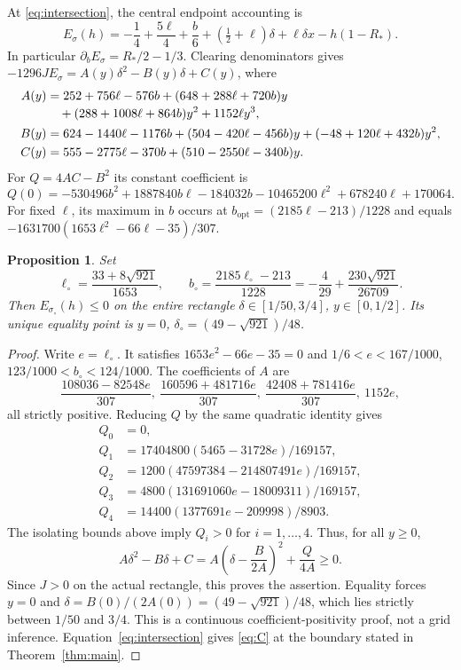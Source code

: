 \documentclass[11pt,a4paper]{article}
\newtheorem{proposition}[theorem]{Proposition}
\theoremstyle{definition}
\newcommand{\sig}{\sigma_\circ}
\begin{document}
At \eqref{eq:intersection}, the central endpoint accounting is
\begin{equation}\label{eq:endpoint}
 E_\sigma(h)=-\frac14+\frac{5\ell}{4}+\frac b6
      +(\tfrac12+\ell)\delta+\ell\delta x-h(1-R_*).
\end{equation}
In particular $\partial_b E_\sigma=R_*/2-1/3$.
Clearing denominators gives
$-1296J E_\sigma=A(y)\delta^2-B(y)\delta+C(y)$, where
\begin{align}
 A(y)&=252+756\ell-576b+(648+288\ell+720b)y
       \notag\\[-2pt]
     &\quad +(288+1008\ell+864b)y^2+1152\ell y^3,\label{eq:ABC}\\
 B(y)&=624-1440\ell-1176b+(504-420\ell-456b)y
          +(-48+120\ell+432b)y^2,\notag\\
 C(y)&=555-2775\ell-370b+(510-2550\ell-340b)y.\notag
\end{align}
For $Q=4AC-B^2$ its constant coefficient is
\[
 Q(0)=-530496b^2+1887840b\ell-184032b
       -10465200\ell^2+678240\ell+170064.
\]
For fixed $\ell$, its maximum in $b$ occurs at
$b_{\mathrm{opt}}=(2185\ell-213)/1228$ and equals
$-1631700(1653\ell^2-66\ell-35)/307$.

\begin{proposition}\label{prop:critical}
Set
\[
 \ell_\circ=\frac{33+8\sqrt{921}}{1653},\qquad
 b_\circ=\frac{2185\ell_\circ-213}{1228}
         =-\frac4{29}+\frac{230\sqrt{921}}{26709}.
\]
Then $E_{\sig}(h)\le0$ on the entire rectangle
$\delta\in[1/50,3/4]$, $y\in[0,1/2]$.
Its unique equality point is
$y=0$, $\delta_\circ=(49-\sqrt{921})/48$.
\end{proposition}
\begin{proof}
Write $e=\ell_\circ$. It satisfies
$1653e^2-66e-35=0$ and
$1/6<e<167/1000$, $123/1000<b_\circ<124/1000$.
The coefficients of $A$ are
\[
 \frac{108036-82548e}{307},\
 \frac{160596+481716e}{307},\
 \frac{42408+781416e}{307},\
 1152e,
\]
all strictly positive. Reducing $Q$ by the same quadratic identity
gives
\begin{align*}
 Q_0&=0,\\
 Q_1&=17404800(5465-31728e)/169157,\\
 Q_2&=1200(47597384-214807491e)/169157,\\
 Q_3&=4800(131691060e-18009311)/169157,\\
 Q_4&=14400(1377691e-209998)/8903 .
\end{align*}
The isolating bounds above imply $Q_i>0$ for $i=1,\ldots,4$.
Thus, for all $y\ge0$,
\[
 A\delta^2-B\delta+C
 =A\left(\delta-\frac{B}{2A}\right)^2+\frac Q{4A}\ge0.
\]
Since $J>0$ on the actual rectangle, this proves the assertion.
Equality forces $y=0$ and
$\delta=B(0)/(2A(0))=(49-\sqrt{921})/48$,
which lies strictly between $1/50$ and $3/4$.
This is a continuous coefficient-positivity proof, not a grid
inference. Equation~\eqref{eq:intersection} gives \eqref{eq:C}
at the boundary stated in Theorem~\ref{thm:main}.
\end{proof}
\end{document}
